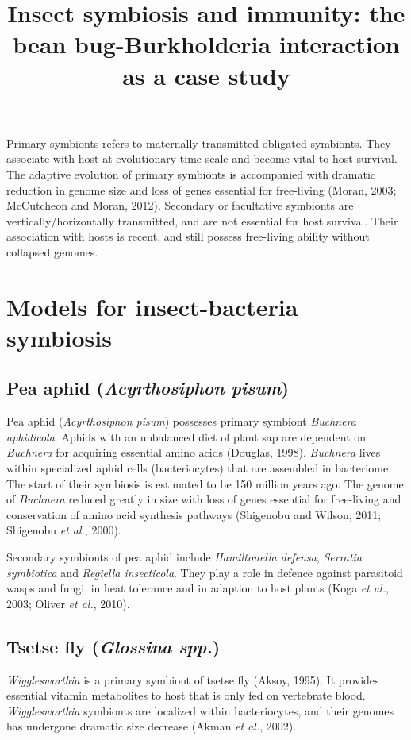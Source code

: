 \documentclass[11pt]{article}
\title{Insect symbiosis and immunity: the bean bug-Burkholderia interaction as a case study}
\author{}
\date{}
\begin{document}
  \maketitle

  \linenumbers
Primary symbionts refers to maternally transmitted obligated symbionts. 
They associate with host at evolutionary time scale and become vital to host survival. 
The adaptive evolution of primary symbionts is accompanied with dramatic reduction in genome size and loss of genes essential for free-living (Moran, 2003; McCutcheon and Moran, 2012). 
Secondary or facultative symbionts are vertically/horizontally transmitted, and are not essential for host survival. 
Their association with hosts is recent, and still possess free-living ability without collapsed genomes.

\section{Models for insect-bacteria symbiosis}
\subsection{Pea aphid (\textit{Acyrthosiphon pisum})}
Pea aphid (\textit{Acyrthosiphon pisum}) possesses primary symbiont \textit{Buchnera aphidicola}. 
Aphids with an unbalanced diet of plant sap are dependent on \textit{Buchnera} for acquiring essential amino acids (Douglas, 1998). 
\textit{Buchnera} lives within specialized aphid cells (bacteriocytes) that are assembled in bacteriome. 
The start of their symbiosis is estimated to be 150 million years ago. 
The genome of \textit{Buchnera} reduced greatly in size with loss of genes essential for free-living and conservation of amino acid synthesis pathways (Shigenobu and Wilson, 2011; Shigenobu \textit{et al.}, 2000).

\newline

Secondary symbionts of pea aphid include \textit{Hamiltonella defensa}, \textit{Serratia symbiotica} and \textit{Regiella insecticola}. 
They play a role in defence against parasitoid wasps and fungi, in heat tolerance and in adaption to host plants (Koga \textit{et al.}, 2003; Oliver \textit{et al.}, 2010).

\subsection{Tsetse fly (\textit{Glossina spp.})}
\textit{Wigglesworthia} is a primary symbiont of tsetse fly (Aksoy, 1995). 
It provides essential vitamin metabolites to host that is only fed on vertebrate blood. 
\textit{Wigglesworthia} symbionts are localized within bacteriocytes, and their genomes has undergone dramatic size decrease (Akman \textit{et al.}, 2002). 
\end{document}
